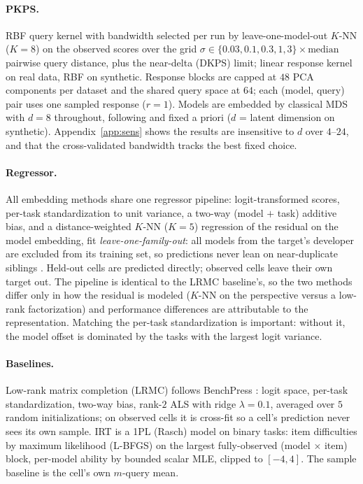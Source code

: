 \documentclass{article}
\theoremstyle{definition}
\theoremstyle{remark}
\theoremstyle{plain}
\newcommand{\PKPS}{PKPS\xspace}
\begin{document}
\paragraph{\PKPS.} RBF query kernel with bandwidth selected per run by leave-one-model-out
$K$-NN ($K{=}8$) on the observed scores over the grid
$\sigma\in\{0.03,0.1,0.3,1,3\}\times\mathrm{median}$ pairwise query distance, plus the
near-delta (DKPS) limit; linear response kernel on real data, RBF on synthetic. Response
blocks are capped at $48$ PCA components per dataset and the shared query space at $64$;
each (model, query) pair uses one sampled response ($r{=}1$). Models are embedded by
classical MDS with $d{=}8$ throughout, following \citet{dkps_qeff} and fixed a priori
($d$ = latent dimension on synthetic). Appendix~\ref{app:sens} shows the results are
insensitive to $d$ over $4$--$24$, and that the cross-validated bandwidth tracks the best
fixed choice.

\paragraph{Regressor.} All embedding methods share one regressor pipeline: logit-transformed
scores, per-task standardization to unit variance, a two-way (model $+$ task) additive
bias, and a distance-weighted $K$-NN ($K{=}5$) regression of the residual on the model
embedding, fit \emph{leave-one-family-out}: all models from the target's developer are
excluded from its training set, so predictions never lean on near-duplicate siblings
\citep{dkps_qeff}. Held-out cells are predicted directly; observed cells leave their own
target out. The pipeline is identical to the LRMC baseline's, so the two methods differ
only in how the residual is modeled ($K$-NN on the perspective versus a low-rank
factorization) and performance differences are attributable to the representation.
Matching the per-task standardization is important: without it, the model offset is
dominated by the tasks with the largest logit variance.

\paragraph{Baselines.} Low-rank matrix completion (LRMC) follows BenchPress \citep{benchpress}: logit
space, per-task standardization, two-way bias, rank-$2$ ALS with ridge $\lambda{=}0.1$,
averaged over $5$ random initializations; on observed cells it is cross-fit so a cell's
prediction never sees its own sample. IRT is a 1PL (Rasch) model on binary tasks: item
difficulties by maximum likelihood (L-BFGS) on the largest fully-observed
(model $\times$ item) block, per-model ability by bounded scalar MLE, clipped to
$[-4,4]$. The sample baseline is the cell's own $m$-query mean.
\end{document}
